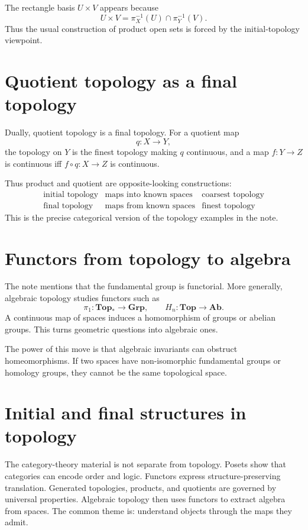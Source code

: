 The rectangle basis \(U\times V\) appears because
\[
  U\times V=\pi_X^{-1}(U)\cap\pi_Y^{-1}(V).
\]
Thus the usual construction of product open sets is forced by the initial-topology viewpoint.

\section{Quotient topology as a final topology}

Dually, quotient topology is a final topology.  For a quotient map
\[
  q:X\to Y,
\]
the topology on \(Y\) is the finest topology making \(q\) continuous, and a map \(f:Y\to Z\) is continuous iff \(f\circ q:X\to Z\) is continuous.

Thus product and quotient are opposite-looking constructions:
\[
\begin{array}{c|c|c}
\text{initial topology} & \text{maps into known spaces} & \text{coarsest topology}\\
\text{final topology} & \text{maps from known spaces} & \text{finest topology}
\end{array}
\]
This is the precise categorical version of the topology examples in the note.

\section{Functors from topology to algebra}

The note mentions that the fundamental group is functorial.  More generally, algebraic topology studies functors such as
\[
  \pi_1:\mathbf{Top}_*\to\mathbf{Grp},\qquad
  H_n:\mathbf{Top}\to\mathbf{Ab}.
\]
A continuous map of spaces induces a homomorphism of groups or abelian groups.  This turns geometric questions into algebraic ones.

The power of this move is that algebraic invariants can obstruct homeomorphisms.  If two spaces have non-isomorphic fundamental groups or homology groups, they cannot be the same topological space.

\section{Initial and final structures in topology}

The category-theory material is not separate from topology.  Posets show that categories can encode order and logic.  Functors express structure-preserving translation.  Generated topologies, products, and quotients are governed by universal properties.  Algebraic topology then uses functors to extract algebra from spaces.  The common theme is: understand objects through the maps they admit.
